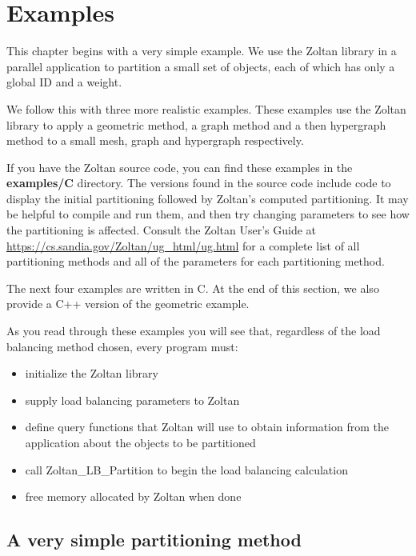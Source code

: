 %
%
\chapter{Examples}
\label{cha:ex}

This chapter begins with a very simple example.  We use the Zoltan
library in a parallel application to partition a small set of 
objects, each of which has only a global ID and a weight.

We follow this with three more realistic examples.
These examples use the Zoltan library to apply a geometric method,
a graph method and a then hypergraph method to a small mesh, graph
and hypergraph respectively.

If you have the Zoltan source code, you can find these
examples in the \textbf{examples/C} directory.  The versions
found in the source code include code to
display the initial partitioning followed by Zoltan's computed
partitioning.  It may be helpful to compile and run them, and
then try changing parameters 
to see how the partitioning is affected.  Consult the Zoltan
User's Guide at
\url{https://cs.sandia.gov/Zoltan/ug_html/ug.html}
for a complete list of all partitioning methods and all of the
parameters for each partitioning method.

The next four examples are written in C.  At the end of this section,
we also provide a C++ version of the geometric example.

As you read through these examples you will see that, regardless 
of the load balancing method chosen, every program must:

\begin{itemize}
\item initialize the Zoltan library
\item supply load balancing parameters to Zoltan
\item define query functions that Zoltan will use to obtain information from the application about the objects to be partitioned
\item call Zoltan\_LB\_Partition to begin the load balancing calculation
\item free memory allocated by Zoltan when done
\end{itemize}

\clearpage
\section{A very simple partitioning method}

